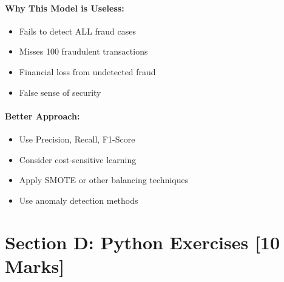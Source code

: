 \documentclass[11pt,a4paper]{article}
\begin{document}
\paragraph{Why This Model is Useless:}
\begin{itemize}
    \item Fails to detect ALL fraud cases
    \item Misses 100 fraudulent transactions
    \item Financial loss from undetected fraud
    \item False sense of security
\end{itemize}

\paragraph{Better Approach:}
\begin{itemize}
    \item Use Precision, Recall, F1-Score
    \item Consider cost-sensitive learning
    \item Apply SMOTE or other balancing techniques
    \item Use anomaly detection methods
\end{itemize}

\vspace{0.5cm}

\section*{Section D: Python Exercises \hfill [10 Marks]}
\end{document}
